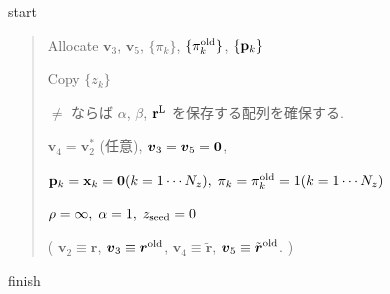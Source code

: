 \documentclass[letterpaper,10pt,dvipdfmx,openany]{sphinxmanual}
\begin{document}
 start
\begin{quote}

Allocate \({\boldsymbol v}_3\), \({\boldsymbol v}_5\),
\(\{\pi_k\}\), \(\{\pi_k^{\rm old}\}\), \(\{{\bf p}_k\}\)

Copy \(\{z_k\}\)

 \(\neq\)  ならば \(\alpha\),
\(\beta\), \({\bf r}^{\rm L}\) を保存する配列を確保する.

\({\boldsymbol v}_4 = {\boldsymbol v}_2^*\) (任意),
\({\boldsymbol v}_3 = {\boldsymbol v}_5 = {\bf 0}\),

\({\bf p}_{k} = {\bf x}_k = {\bf 0}(k=1 \cdots N_z),\; \pi_k=\pi_k^{\rm old} = 1(k=1 \cdots N_z)\)

\(\rho = \infty,\; \alpha = 1,\; z_{\rm seed}=0\)

( \({\boldsymbol v}_2 \equiv {\boldsymbol r}\),
\({\boldsymbol v}_3 \equiv {\boldsymbol r}^{\rm old}\),
\({\boldsymbol v}_4 \equiv {\tilde {\boldsymbol r}}\),
\({\boldsymbol v}_5 \equiv {\tilde {\boldsymbol r}}^{\rm old}\). )
\end{quote}

 finish
\end{document}
